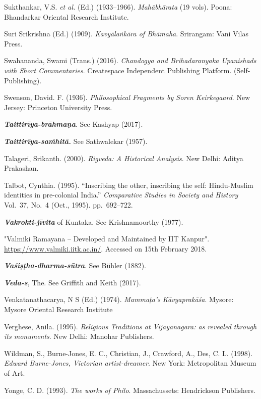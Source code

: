 \begin{thebibliography}{99}
Sukthankar, V.S. {\sl et al.} (Ed.) (1933--1966). {\sl Mahābhārata} (19 vols). Poona: Bhandarkar Oriental Research Institute. 

Suri Srikrishna (Ed.) (1909). {\sl Kavyālaṅkāra of Bhāmaha}. Srirangam: Vani Vilas Press. 

Swahananda, Swami (Trans.) (2016). {\sl Chandogya and Brihadaranyaka Upanishads with Short Commentaries}. Createspace Independent Publishing Platform. (Self-Publishing). 

Swenson, David. F. (1936). {\sl Philosophical Fragments by Soren Keirkegaard}. New Jersey: Princeton University Press. 

{\sl\bfseries Taittirīya-brāhmaṇa}. See Kashyap (2017).

{\sl\bfseries Taittirīya-saṁhitā.} See Sathwalekar (1957).

Talageri, Srikanth. (2000). {\sl Rigveda: A Historical Analysis}. New Delhi: Aditya Prakashan. 

Talbot, Cynthia. (1995). “Inscribing the other, inscribing the self: Hindu-Muslim identities in pre-colonial India.” {\sl Comparative Studies in Society and History} Vol.~37, No.~4 (Oct., 1995). pp.~692--722.

{\sl\bfseries Vakrokti-jīvita} of Kuntaka. See Krishnamoorthy (1977).

"Valmiki Ramayana -- Developed and Maintained by IIT Kanpur". \url{https://www.valmiki.iitk.ac.in/}. Accessed on 15th February 2018.

{\sl\bfseries Vaśiṣṭha-dharma-sūtra}. See Bühler (1882).

{\sl\bfseries Veda-s}, The. See Griffith and Keith (2017).

Venkatanathacarya, N S (Ed.) (1974). {\sl Mammaṭa’s Kāvyaprakāśa}. Mysore: Mysore Oriental Research Institute

Verghese, Anila. (1995). {\sl Religious Traditions at Vijayanagara: as revealed through its monuments}. New  Delhi: Manohar Publishers. 

Wildman, S., Burne-Jones, E. C., Christian, J., Crawford, A., Des, C. L. (1998). {\sl Edward Burne-Jones, Victorian artist-dreamer}. New York: Metropolitan Museum of Art. 

Yonge, C. D. (1993). {\sl The works of Philo}. Massachussets: Hendrickson Publishers.
\end{thebibliography}
